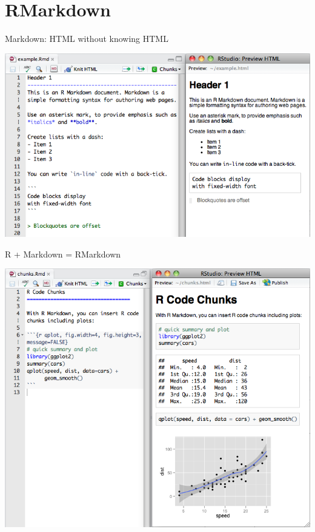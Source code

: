 \documentclass[10pt]{beamer}\usepackage[]{graphicx}\usepackage[]{color}
\begin{document}
\section{RMarkdown}

\begin{frame}{Markdown: HTML without knowing HTML}
\begin{center}
\includegraphics[scale=0.45, keepaspectratio]{markdown}
\end{center}
\end{frame}

\begin{frame}{R + Markdown = RMarkdown}
\begin{center}
\includegraphics[scale=0.36, keepaspectratio]{rmarkdown}
\end{center}
\end{frame}
\end{document}
